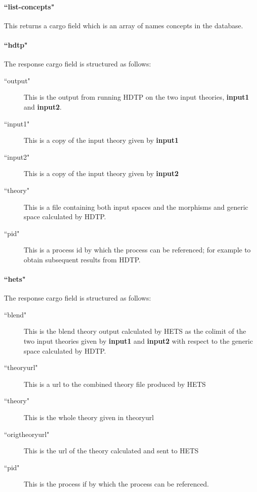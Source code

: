 \paragraph{``list-concepts"}

This returns a cargo field which is an array of names concepts in the database.

\paragraph{``hdtp"}
	
The response cargo field is structured as follows:
\begin{description}
\item[``output"] This is the output from running HDTP on the two input theories, {\bf input1} and {\bf input2}.
\item[``input1"] This is a copy of the input theory given by {\bf input1}
\item[``input2"] This is a copy of the input theory given by {\bf input2}
\item[``theory"] This is a file containing both input spaces and the morphisms and generic space calculated by HDTP.
\item[``pid"] This is a process id by which the process can be referenced; for example to obtain subsequent results from HDTP.
\end{description}
 
\paragraph{``hets"}

The response cargo field is structured as follows:
\begin{description}
\item[``blend"] This is the blend theory output calculated by HETS as the colimit of the two input theories given by {\bf input1} and {\bf input2} with respect to the generic space calculated by HDTP.
\item[``theoryurl"] This is a url to the combined theory file produced by HETS
\item[``theory"] This is the whole theory given in theoryurl
\item[``origtheoryurl"] This is the url of the theory calculated and sent to HETS 
\item[``pid"] This is the process if by which the process can be referenced.
\end{description}


